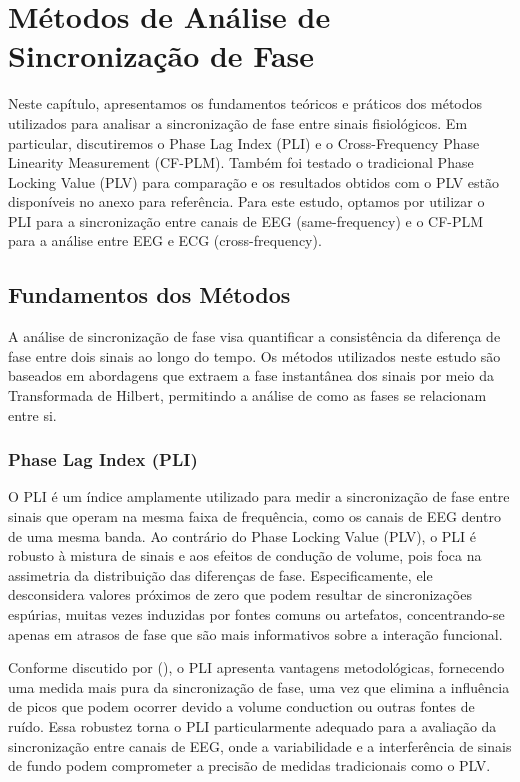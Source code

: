 \chapter{Métodos de Análise de Sincronização de Fase}
\label{chap:6_metodos_de_analise_de_sincronizacao_de_fase}

Neste capítulo, apresentamos os fundamentos teóricos e práticos dos métodos utilizados para analisar a sincronização de fase entre sinais fisiológicos. Em particular, discutiremos o Phase Lag Index (PLI) e o Cross-Frequency Phase Linearity Measurement (CF-PLM). Também foi testado o tradicional Phase Locking Value (PLV) para comparação e os resultados obtidos com o PLV estão disponíveis no anexo para referência. Para este estudo, optamos por utilizar o PLI para a sincronização entre canais de EEG (same-frequency) e o CF-PLM para a análise entre EEG e ECG (cross-frequency).

\section{Fundamentos dos Métodos}

A análise de sincronização de fase visa quantificar a consistência da diferença de fase entre dois sinais ao longo do tempo. Os métodos utilizados neste estudo são baseados em abordagens que extraem a fase instantânea dos sinais por meio da Transformada de Hilbert, permitindo a análise de como as fases se relacionam entre si.

\subsection{Phase Lag Index (PLI)}

O PLI é um índice amplamente utilizado para medir a sincronização de fase entre sinais que operam na mesma faixa de frequência, como os canais de EEG dentro de uma mesma banda. Ao contrário do Phase Locking Value (PLV), o PLI é robusto à mistura de sinais e aos efeitos de condução de volume, pois foca na assimetria da distribuição das diferenças de fase. Especificamente, ele desconsidera valores próximos de zero que podem resultar de sincronizações espúrias, muitas vezes induzidas por fontes comuns ou artefatos, concentrando-se apenas em atrasos de fase que são mais informativos sobre a interação funcional.

Conforme discutido por \citeauthor{seraj2018cerebral} (\citeyear{seraj2018cerebral}), o PLI apresenta vantagens metodológicas, fornecendo uma medida mais pura da sincronização de fase, uma vez que elimina a influência de picos que podem ocorrer devido a volume conduction ou outras fontes de ruído. Essa robustez torna o PLI particularmente adequado para a avaliação da sincronização entre canais de EEG, onde a variabilidade e a interferência de sinais de fundo podem comprometer a precisão de medidas tradicionais como o PLV.

